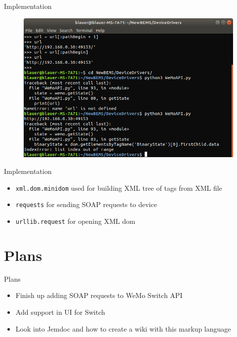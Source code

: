 \documentclass{beamer}
\begin{document}
\begin{frame}{Implementation}{}
\begin{figure}
\includegraphics[scale=0.4]{../figs/img/getStateIndexError}
\end{figure}
\end{frame}

\begin{frame}{Implementation}{}
	\begin{itemize}
		\item \texttt{xml.dom.minidom} used for building XML tree of tags from XML file
		\item \texttt{requests} for sending SOAP requests to device
		\item \texttt{urllib.request} for opening XML dom
	\end{itemize}
\end{frame}

\section{Plans}
\begin{frame}{Plans}{}
	\begin{itemize}
		\item Finish up adding SOAP requests to WeMo Switch API
		\item Add support in UI for Switch
		\item Look into Jemdoc and how to create a wiki with this markup language
	\end{itemize}
\end{frame}
\end{document}
